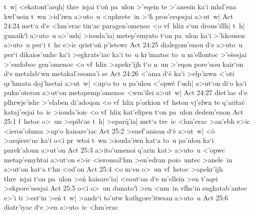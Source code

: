 t~w|
<ekatont'arqh|
thre~isjai
t`on\r{}
pa~ulon
>'eqein
te
>'anesin
ka`i
mhd'ena
kwl'uein
t~wn
>id'iwn
a>uto~u
<uphrete~in
>`h\r{}
pros'erqesjai
a>ut~w|\bibvsend
\vs Act 24:24
met`a
d`e
<hm'erac
tin`ac
paragen'omenoc
<o
vf~hlix
s`un
drous'illh|
t~h|
gunaik`i\r{}
a>uto~u
o>'ush|
>iouda'ia|
metep'emyato
t`on
pa~ulon
ka`i
>'hkousen
a>uto~u
per`i
t~hc
e>ic
qrist`o\r{n}
p'istewc\bibvsend
\vs Act 24:25
dialegom'enou
d`e
a>uto~u
per`i
dikaios'unhc
ka`i
>egkrate'iac
ka`i
to~u
kr'imatoc
to~u
m'ellontoc
>'e\r{s}esjai
>'emfoboc
gen'omenoc
<o
vf~hlix
>apekr'ijh
t`o
n~un
>'eqon
pore'uou
kair`on
d`e
metalab`wn
metakal'esoma'i
se\bibvsend
\vs Act 24:26
<'ama
d`e\r{}
ka`i
>elp'izwn
<'oti
qr'hmata
doj'hsetai
a>ut~w|
<up`o
to~u
pa'ulou
<'opwc\r{}
l'ush|
a>ut`on
di`o
ka`i
pukn'oteron
a>ut`on
metapemp'omenoc
<wm'ilei
a>ut~w|\bibvsend
\vs Act 24:27
diet'iac
d`e
plhrwje'ishc
>'elaben
di'adoqon
<o
vf~hlix
p'orkion
vf~hston
vj'elwn
te
q'arita\r{c}
kataj'esjai
to~ic
>iouda'ioic
<o
vf~hlix
kat'elipen
t`on
pa~ulon
dedem'enon\bibvsend
\vs Act 25:1
f~hstoc
o>~un
>epib`ac
t~h|
>epar\r{q}'ia|
met`a
tre~ic
<hm'erac
>an'ebh
e>ic
<ieros'oluma
>ap`o
kaisare'iac\bibvsend
\vs Act 25:2
>enef'anisan
d`e\r{}
a>ut~w|
<o\r{}
>arqiere`uc
ka`i
o<i
pr~wtoi
t~wn
>iouda'iwn
kat`a
to~u
pa'ulou
ka`i
parek'aloun
a>ut'on\bibvsend
\vs Act 25:3
a>ito'umenoi
q'arin
kat>
a>uto~u
<'opwc
metap'emyhtai
a>ut`on
e>ic
<ierousal`hm
>en'edran
poio~untec
>anele~in
a>ut`on
kat`a
t`hn
<od'on\bibvsend
\vs Act 25:4
<o
m`en
o>~un
vf~hstoc
>apekr'ijh
thre~isjai
t`on
pa~ulon
>en\r{}
kaisare'ia|
<eaut`on
d`e
m'ellein
>en
t'aqei
>ekpore'uesjai\bibvsend
\vs Act 25:5
o<i
o>~un
dunato`i\r{}
>en
<um~in
vfhs`in
sugkatab'antec
e>'i
ti
>est`in
>en\r{}
t~w|
>andr`i
to'utw
kathgore'itwsan
a>uto~u\bibvsend
\vs Act 25:6
diatr'iyac
d`e
>en
a>uto~ic
<hm'erac
